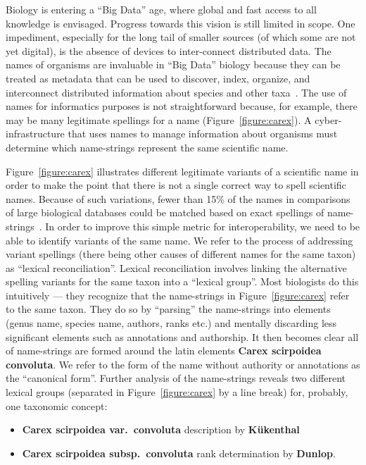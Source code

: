 \documentclass{bmcart}
\begin{document}
Biology is entering a ``Big Data'' age, where global and fast access to all knowledge is envisaged. Progress towards this vision is still limited in scope. One impediment, especially for the long tail of smaller sources (of which some are not yet digital), is the absence of devices to inter-connect distributed data. The names of organisms are invaluable in ``Big Data'' biology because they can be treated as metadata that can be used to discover, index, organize, and interconnect distributed information about species and other taxa~\cite{Patterson2010}. The use of names for informatics purposes is not straightforward because, for example, there may be many legitimate spellings for a name (Figure~\ref{figure:carex}). A cyber-infrastructure that uses names to manage information about organisms must determine which name-strings represent the same scientific name.

Figure~\ref{figure:carex} illustrates different legitimate variants of a scientific name in order to make the point that there is not a single correct way to spell scientific names. Because of such variations, fewer than 15\% of the names in comparisons of large biological databases could be matched based on exact spellings of name-strings~\cite{Patterson2016}. In order to improve this simple metric for interoperability, we need to be able to identify variants of the same name. We refer to the process of addressing variant spellings (there being other causes of different names for the same taxon) as ``lexical reconciliation''.  Lexical reconciliation involves linking the alternative spelling variants for the same taxon into a ``lexical group''. Most biologists do this intuitively --- they recognize that the name-strings in Figure~\ref{figure:carex} refer to the same taxon. They do so by ``parsing'' the name-strings into elements (genus name, species name, authors, ranks etc.) and mentally discarding less significant elements such as annotations and authorship. It then becomes clear all of name-strings are formed around the latin elements  \textbf{Carex scirpoidea convoluta}. We refer to the form of the name without authority or annotations as the ``canonical form''. Further analysis of the name-strings  reveals two different lexical groups (separated in Figure~\ref{figure:carex} by a line break) for, probably, one taxonomic concept:

\begin{itemize}

  \item \textbf{Carex scirpoidea var.\ convoluta} description by
    \textbf{Kükenthal}

  \item \textbf{Carex scirpoidea subsp.\ convoluta} rank determination by
    \textbf{Dunlop}.

\end{itemize}
\end{document}
